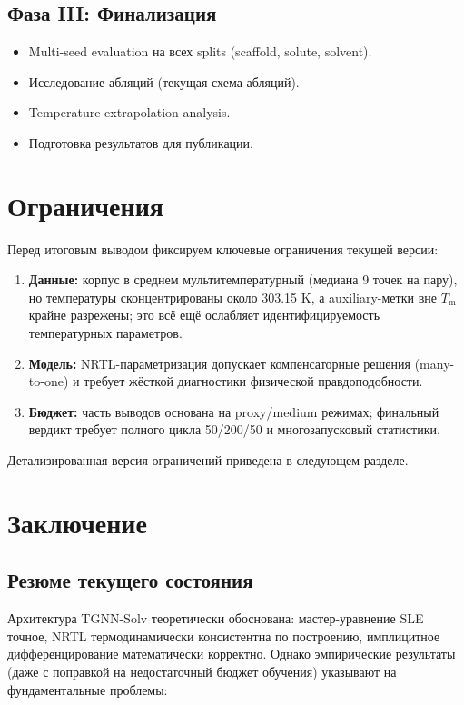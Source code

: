 \documentclass[11pt]{article}
\begin{document}
\subsection{Фаза III: Финализация}
\label{subsec:roadmap-phase3}

\begin{itemize}
  \item Multi-seed evaluation на всех splits (scaffold, solute, solvent).
  \item Исследование абляций (текущая схема абляций).
  \item Temperature extrapolation analysis.
  \item Подготовка результатов для публикации.
\end{itemize}

\section{Ограничения}

Перед итоговым выводом фиксируем ключевые ограничения текущей версии:
\begin{enumerate}
  \item \textbf{Данные:} корпус в среднем мультитемпературный (медиана 9 точек на пару), но температуры сконцентрированы около 303.15 K, а auxiliary-метки вне $T_{\mathrm{m}}$ крайне разрежены; это всё ещё ослабляет идентифицируемость температурных параметров.
  \item \textbf{Модель:} NRTL-параметризация допускает компенсаторные решения (many-to-one) и требует жёсткой диагностики физической правдоподобности.
  \item \textbf{Бюджет:} часть выводов основана на proxy/medium режимах; финальный вердикт требует полного цикла 50/200/50 и многозапусковый статистики.
\end{enumerate}

Детализированная версия ограничений приведена в следующем разделе.

\section{Заключение}

\subsection{Резюме текущего состояния}

Архитектура TGNN-Solv теоретически обоснована: мастер-уравнение SLE точное, NRTL термодинамически консистентна по построению, имплицитное дифференцирование математически корректно. Однако эмпирические результаты (даже с поправкой на недостаточный бюджет обучения) указывают на фундаментальные проблемы:
\end{document}
